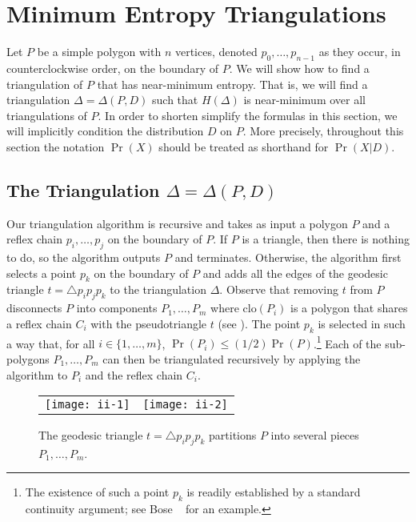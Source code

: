 \documentclass[lotsofwhite]{patmorin}
\newcommand{\closure}{\mathrm{clo}}
\begin{document}
\section{Minimum Entropy Triangulations} 

Let $P$ be a simple polygon with $n$ vertices, denoted
$p_0,\ldots,p_{n-1}$ as they occur, in counterclockwise order, on the
boundary of $P$.  We will show how to find a triangulation of $P$ that
has near-minimum entropy.  That is, we will find a triangulation
$\Delta=\Delta(P,D)$ such that $H(\Delta)$ is near-minimum over all
triangulations of $P$.  In order to shorten simplify the formulas in
this section, we will implicitly condition the distribution $D$ on
$P$.  More precisely, throughout this section the notation $\Pr(X)$
should be treated as shorthand for $\Pr(X|D)$.

\subsection{The Triangulation $\Delta=\Delta(P,D)$}

Our triangulation algorithm is recursive and takes as input a polygon
$P$ and a reflex chain $p_i,\ldots,p_j$ on the boundary of $P$.  If
$P$ is a triangle, then there is nothing to do, so the algorithm
outputs $P$ and terminates. Otherwise, the
algorithm first selects a point $p_k$ on the boundary of $P$ and adds
all the edges of the geodesic triangle $t=\triangle p_ip_jp_k$ to the
triangulation $\Delta$.
Observe that removing $t$ from $P$ disconnects $P$ into
components $P_1,\ldots,P_m$ where $\closure(P_i)$ is a polygon that shares a
reflex chain $C_i$ with the pseudotriangle $t$ (see
).  The point
$p_k$ is selected in such a way that, for all $i\in\{1,\ldots,m\}$, $\Pr(P_i)
\le (1/2)\Pr(P)$.\footnote{The existence of such a point $p_k$ is
readily established by a standard continuity argument; see Bose \etal\
\cite{bdhlim07} for an example.} Each of the sub-polygons $P_1,\ldots,P_m$
can then be triangulated recursively by applying the algorithm to
$P_i$ and the reflex chain $C_i$.

\begin{figure}
  \begin{center}
    \begin{tabular}{cc}
      \texttt{[image: ii-1]} & \texttt{[image: ii-2]} 
    \end{tabular}
  \end{center}
  \caption{The geodesic triangle $t=\triangle p_i p_j p_k$ partitions $P$ into several
pieces $P_1,\ldots,P_m$.}
\end{figure}
\end{document}
